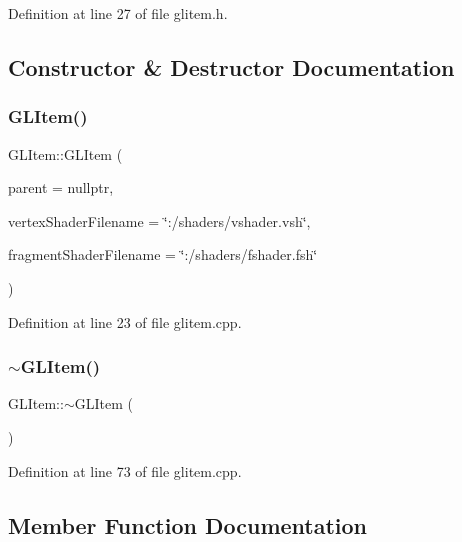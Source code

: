 Definition at line 27 of file glitem.\+h.



\subsection{Constructor \& Destructor Documentation}
\mbox{\label{class_g_l_item_aae26b9d7f00f845229e3e0dfaec07392}} 
\subsubsection{\texorpdfstring{GLItem()}{GLItem()}}
{\footnotesize\ttfamily G\+L\+Item\+::\+G\+L\+Item (\begin{DoxyParamCaption}\item[{Q\+Quick\+Item $\ast$}]{parent = {\ttfamily nullptr},  }\item[{const Q\+String \&}]{vertex\+Shader\+Filename = {\ttfamily \char`\"{}\+:/shaders/vshader.vsh\char`\"{}},  }\item[{const Q\+String \&}]{fragment\+Shader\+Filename = {\ttfamily \char`\"{}\+:/shaders/fshader.fsh\char`\"{}} }\end{DoxyParamCaption})\hspace{0.3cm}{\ttfamily [explicit]}}



Definition at line 23 of file glitem.\+cpp.

\mbox{\label{class_g_l_item_a7957569811963cb1f0cc6639262e506d}} 
\subsubsection{\texorpdfstring{$\sim$GLItem()}{~GLItem()}}
{\footnotesize\ttfamily G\+L\+Item\+::$\sim$\+G\+L\+Item (\begin{DoxyParamCaption}{ }\end{DoxyParamCaption})\hspace{0.3cm}{\ttfamily [virtual]}}



Definition at line 73 of file glitem.\+cpp.



\subsection{Member Function Documentation}
\mbox{\label{class_g_l_item_acbf456bdbaf38bc941029bddab6a69a9}} 
